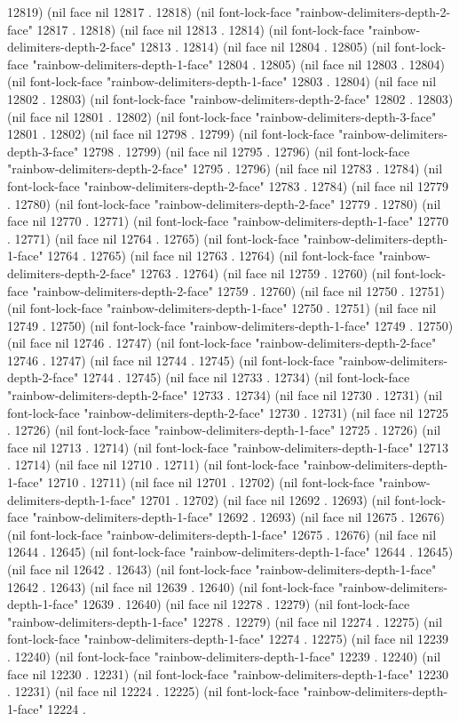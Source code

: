 12819) (nil face nil 12817 . 12818) (nil font-lock-face "rainbow-delimiters-depth-2-face" 12817 . 12818) (nil face nil 12813 . 12814) (nil font-lock-face "rainbow-delimiters-depth-2-face" 12813 . 12814) (nil face nil 12804 . 12805) (nil font-lock-face "rainbow-delimiters-depth-1-face" 12804 . 12805) (nil face nil 12803 . 12804) (nil font-lock-face "rainbow-delimiters-depth-1-face" 12803 . 12804) (nil face nil 12802 . 12803) (nil font-lock-face "rainbow-delimiters-depth-2-face" 12802 . 12803) (nil face nil 12801 . 12802) (nil font-lock-face "rainbow-delimiters-depth-3-face" 12801 . 12802) (nil face nil 12798 . 12799) (nil font-lock-face "rainbow-delimiters-depth-3-face" 12798 . 12799) (nil face nil 12795 . 12796) (nil font-lock-face "rainbow-delimiters-depth-2-face" 12795 . 12796) (nil face nil 12783 . 12784) (nil font-lock-face "rainbow-delimiters-depth-2-face" 12783 . 12784) (nil face nil 12779 . 12780) (nil font-lock-face "rainbow-delimiters-depth-2-face" 12779 . 12780) (nil face nil 12770 . 12771) (nil font-lock-face "rainbow-delimiters-depth-1-face" 12770 . 12771) (nil face nil 12764 . 12765) (nil font-lock-face "rainbow-delimiters-depth-1-face" 12764 . 12765) (nil face nil 12763 . 12764) (nil font-lock-face "rainbow-delimiters-depth-2-face" 12763 . 12764) (nil face nil 12759 . 12760) (nil font-lock-face "rainbow-delimiters-depth-2-face" 12759 . 12760) (nil face nil 12750 . 12751) (nil font-lock-face "rainbow-delimiters-depth-1-face" 12750 . 12751) (nil face nil 12749 . 12750) (nil font-lock-face "rainbow-delimiters-depth-1-face" 12749 . 12750) (nil face nil 12746 . 12747) (nil font-lock-face "rainbow-delimiters-depth-2-face" 12746 . 12747) (nil face nil 12744 . 12745) (nil font-lock-face "rainbow-delimiters-depth-2-face" 12744 . 12745) (nil face nil 12733 . 12734) (nil font-lock-face "rainbow-delimiters-depth-2-face" 12733 . 12734) (nil face nil 12730 . 12731) (nil font-lock-face "rainbow-delimiters-depth-2-face" 12730 . 12731) (nil face nil 12725 . 12726) (nil font-lock-face "rainbow-delimiters-depth-1-face" 12725 . 12726) (nil face nil 12713 . 12714) (nil font-lock-face "rainbow-delimiters-depth-1-face" 12713 . 12714) (nil face nil 12710 . 12711) (nil font-lock-face "rainbow-delimiters-depth-1-face" 12710 . 12711) (nil face nil 12701 . 12702) (nil font-lock-face "rainbow-delimiters-depth-1-face" 12701 . 12702) (nil face nil 12692 . 12693) (nil font-lock-face "rainbow-delimiters-depth-1-face" 12692 . 12693) (nil face nil 12675 . 12676) (nil font-lock-face "rainbow-delimiters-depth-1-face" 12675 . 12676) (nil face nil 12644 . 12645) (nil font-lock-face "rainbow-delimiters-depth-1-face" 12644 . 12645) (nil face nil 12642 . 12643) (nil font-lock-face "rainbow-delimiters-depth-1-face" 12642 . 12643) (nil face nil 12639 . 12640) (nil font-lock-face "rainbow-delimiters-depth-1-face" 12639 . 12640) (nil face nil 12278 . 12279) (nil font-lock-face "rainbow-delimiters-depth-1-face" 12278 . 12279) (nil face nil 12274 . 12275) (nil font-lock-face "rainbow-delimiters-depth-1-face" 12274 . 12275) (nil face nil 12239 . 12240) (nil font-lock-face "rainbow-delimiters-depth-1-face" 12239 . 12240) (nil face nil 12230 . 12231) (nil font-lock-face "rainbow-delimiters-depth-1-face" 12230 . 12231) (nil face nil 12224 . 12225) (nil font-lock-face "rainbow-delimiters-depth-1-face" 12224 . 